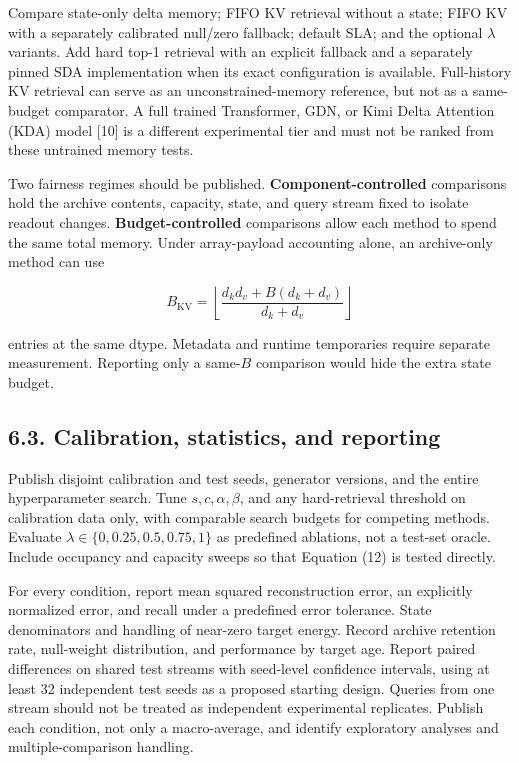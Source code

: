 \documentclass[11pt,a4paper]{article}
\begin{document}
Compare state-only delta memory; FIFO KV retrieval without a state; FIFO KV with a separately calibrated null/zero fallback; default SLA; and the optional \(\lambda\) variants. Add hard top-1 retrieval with an explicit fallback and a separately pinned SDA implementation when its exact configuration is available. Full-history KV retrieval can serve as an unconstrained-memory reference, but not as a same-budget comparator. A full trained Transformer, GDN, or Kimi Delta Attention (KDA) model {[}10{]} is a different experimental tier and must not be ranked from these untrained memory tests.

Two fairness regimes should be published. \textbf{Component-controlled} comparisons hold the archive contents, capacity, state, and query stream fixed to isolate readout changes. \textbf{Budget-controlled} comparisons allow each method to spend the same total memory. Under array-payload accounting alone, an archive-only method can use

\nopagebreak[4]

\[
B_{\mathrm{KV}}=\left\lfloor\frac{d_kd_v+B(d_k+d_v)}{d_k+d_v}\right\rfloor \tag{15}
\]

entries at the same dtype. Metadata and runtime temporaries require separate measurement. Reporting only a same-\(B\) comparison would hide the extra state budget.

\subsection{6.3. Calibration, statistics, and reporting}\label{calibration-statistics-and-reporting}

Publish disjoint calibration and test seeds, generator versions, and the entire hyperparameter search. Tune \(s,c,\alpha,\beta\), and any hard-retrieval threshold on calibration data only, with comparable search budgets for competing methods. Evaluate \(\lambda\in\{0,0.25,0.5,0.75,1\}\) as predefined ablations, not a test-set oracle. Include occupancy and capacity sweeps so that Equation (12) is tested directly.

For every condition, report mean squared reconstruction error, an explicitly normalized error, and recall under a predefined error tolerance. State denominators and handling of near-zero target energy. Record archive retention rate, null-weight distribution, and performance by target age. Report paired differences on shared test streams with seed-level confidence intervals, using at least 32 independent test seeds as a proposed starting design. Queries from one stream should not be treated as independent experimental replicates. Publish each condition, not only a macro-average, and identify exploratory analyses and multiple-comparison handling.
\end{document}
